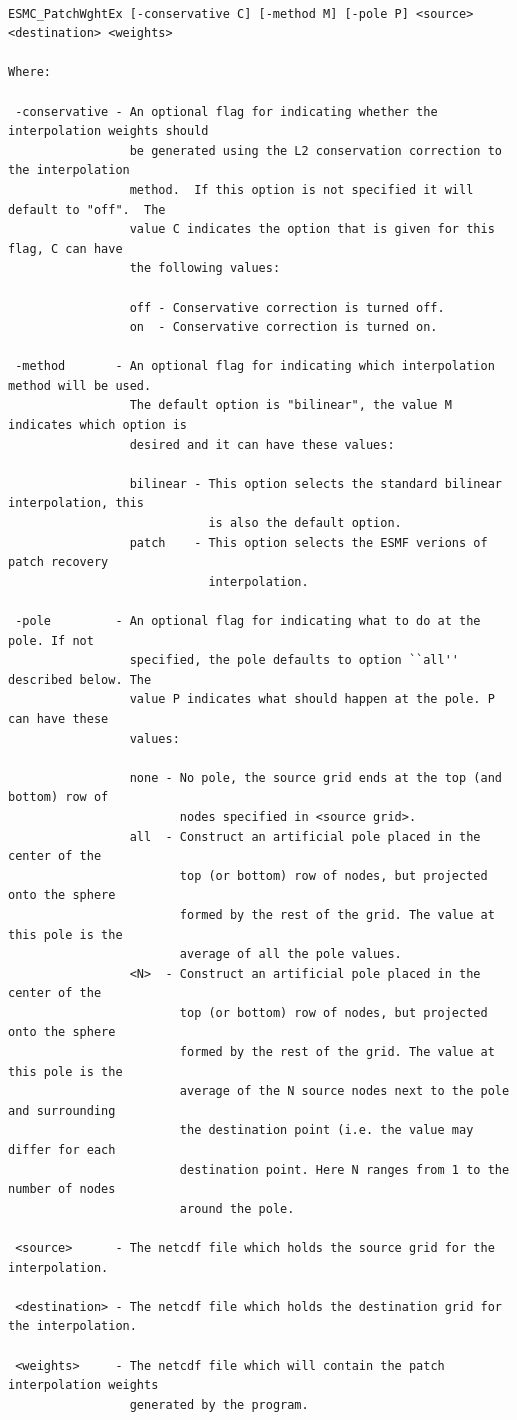 \begin{verbatim}

ESMC_PatchWghtEx [-conservative C] [-method M] [-pole P] <source> <destination> <weights>

Where:

 -conservative - An optional flag for indicating whether the interpolation weights should
                 be generated using the L2 conservation correction to the interpolation
                 method.  If this option is not specified it will default to "off".  The 
                 value C indicates the option that is given for this flag, C can have 
                 the following values:

                 off - Conservative correction is turned off.
                 on  - Conservative correction is turned on.  

 -method       - An optional flag for indicating which interpolation method will be used.
                 The default option is "bilinear", the value M indicates which option is 
                 desired and it can have these values:

                 bilinear - This option selects the standard bilinear interpolation, this
                            is also the default option.
                 patch    - This option selects the ESMF verions of patch recovery 
                            interpolation.

 -pole         - An optional flag for indicating what to do at the pole. If not 
                 specified, the pole defaults to option ``all'' described below. The 
                 value P indicates what should happen at the pole. P can have these 
                 values:

                 none - No pole, the source grid ends at the top (and bottom) row of 
                        nodes specified in <source grid>.
                 all  - Construct an artificial pole placed in the center of the 
                        top (or bottom) row of nodes, but projected onto the sphere 
                        formed by the rest of the grid. The value at this pole is the 
                        average of all the pole values.
                 <N>  - Construct an artificial pole placed in the center of the 
                        top (or bottom) row of nodes, but projected onto the sphere 
                        formed by the rest of the grid. The value at this pole is the 
                        average of the N source nodes next to the pole and surrounding
                        the destination point (i.e. the value may differ for each
                        destination point. Here N ranges from 1 to the number of nodes 
                        around the pole. 
                  
 <source>      - The netcdf file which holds the source grid for the interpolation. 

 <destination> - The netcdf file which holds the destination grid for the interpolation. 

 <weights>     - The netcdf file which will contain the patch interpolation weights 
                 generated by the program.

\end{verbatim}


\newpage





